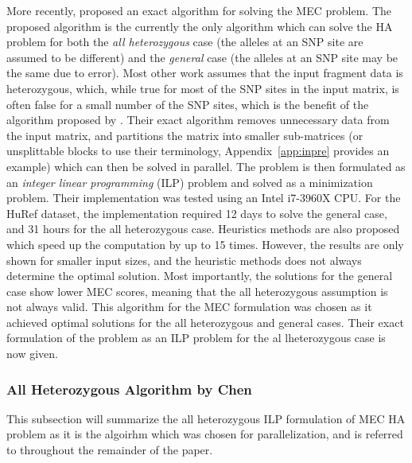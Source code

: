\documentclass[10pt,twocolumn]{article}
\begin{document}
More recently, \cite{chen:2013} proposed an exact algorithm for solving the MEC problem. The proposed
algorithm is the currently the only algorithm which can solve the HA problem for both the \textit{all heterozygous}
case (the alleles at an SNP site are assumed to be different) and the \textit{general} case (the 
alleles at an SNP site may be the same due to error). Most other work assumes that the input fragment data is 
heterozygous, which, while true for most of the SNP sites in the input matrix, is often false for a small 
number of the SNP sites, which is the benefit of the algorithm proposed by \cite{chen:2013}. Their exact
algorithm removes unnecessary data from the input matrix, and partitions the matrix into smaller sub-matrices
(or unsplittable blocks to use their terminology, Appendix~\ref{app:inpre} provides an example) which can then 
be solved in parallel. The problem is then formulated as an \textit{integer linear programming} (ILP) problem 
and solved as a minimization problem. Their implementation was tested using an Intel i7-3960X CPU. For the 
HuRef dataset, the implementation required 12 days to solve the general case, and 31 hours for the all heterozygous case. 
Heuristics methods are also proposed which speed up the computation by up to 15 times. However, the results 
are only shown for smaller input sizes, and the heuristic methods does  not always determine the optimal 
solution. Most importantly, the solutions for the general case show lower MEC scores, meaning that the 
all heterozygous assumption is not always valid. This algorithm for the MEC formulation was chosen as it
achieved optimal solutions for the all heterozygous and general cases. Their exact formulation of the problem
as an ILP problem for the al lheterozygous case is now given.

\subsubsection{All Heterozygous Algorithm by Chen} \label{sec:allhetro}

This subsection will summarize the all heterozygous ILP formulation of MEC HA problem as it is the algoirhm
which was chosen for parallelization, and is referred to throughout the remainder of the paper.
\end{document}
